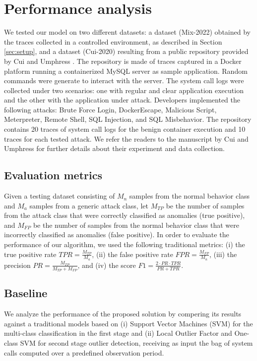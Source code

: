 \section{Performance analysis}\label{sec:results}
We tested our model on two different datasets: a dataset (Mix-2022) obtained by the traces collected in a controlled environment, as described in Section \ref{sec:setup}, and a dataset (Cui-2020) resulting from a public repository provided by Cui and Umphress \cite{cui2020towards}. The repository is made of traces captured in a Docker platform running a containerized MySQL server as sample application. Random commands were generate to interact with the server. The system call logs were collected under two scenarios: one with regular and clear application execution and the other with the application under attack. Developers implemented the following attacks: Brute Force Login, DockerEscape, Malicious Script, Meterpreter, Remote Shell, SQL Injection, and SQL Misbehavior. The repository contains 20 traces of system call logs for the benign container execution and 10 traces for each tested attack. We refer the readers to the manuscript by Cui and Umphress  \cite{cui2020towards} for further details about their experiment and data collection.


\subsection{Evaluation metrics}
Given a testing dataset consisting of $M_{n}$ samples from the normal behavior class and $M_{a}$  samples from a generic attack class, let $M_{TP}$ be the number of samples from the attack class that were correctly classified as anomalies (true positive), and $M_{FP}$ be the number of samples from the normal behavior class that were incorrectly classified as anomalies (false positive). In order to evaluate the performance of our algorithm, we used the following traditional metrics: (i) the true positive rate $TPR = \frac{M_{TP}}{M_a}$, (ii) the false positive rate $FPR = \frac{M_{FP}}{M_n}$, (iii) the precision $PR = \frac{M_{TP}}{M_{TP}+M_{FP}}$, and (iv) the score $F1=\frac{2\cdot PR\cdot TPR}{PR + TPR}$.


\subsection{Baseline}
We analyze the performance of the proposed solution by compering its results against a traditional models based on (i) Support Vector Machines (SVM) for the multi-class classification in the first stage and (ii) Local Outlier Factor and One-class SVM for second stage outlier detection, receiving as input the bag of system calls computed over a predefined observation period.

